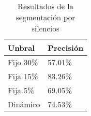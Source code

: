 \begin{table}[H]
\centering
\caption{Resultados de la segmentación por silencios}
\label{tab:resultados_segmentacion_silencios}
\begin{tabular}{|l|l|}
\textbf{Unbral} & \textbf{Precisión} \\ \hline
Fijo 30\%  & 57.01\% \\  \hline
Fija 15\% & 83.26\% \\  \hline
Fija 5\% & 69.05\% \\  \hline
Dinámico  & 74.53\% \\  \hline
\end{tabular}
\end{table}